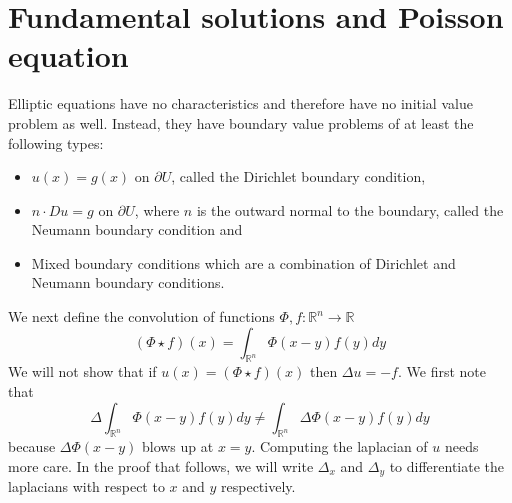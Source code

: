 \documentclass{article}
\theoremstyle{plain}
\numberwithin{thm}{section}
\theoremstyle{plain}
\numberwithin{prop}{section}
\theoremstyle{definition}
\numberwithin{defn}{section}
\theoremstyle{remark}
\numberwithin{equation}{section}
\begin{document}
\section{Fundamental solutions and Poisson equation}\label{s20}
Elliptic equations have no characteristics and therefore have no initial value problem as well. 
Instead, they have boundary value problems of at least the following types:
\begin{itemize} 
\item $u(x) = g(x)$ on $\partial U$, called the Dirichlet boundary condition,
\item $n\cdot Du = g$ on $\partial U$, where $n$ is the outward normal to the boundary, called
the Neumann boundary condition and
\item Mixed boundary conditions which are a combination of Dirichlet and Neumann boundary conditions.
\end{itemize}

\noindent We next define the convolution of functions $\Phi, f: \mathbb{R}^n \rightarrow \mathbb{R}$
\begin{equation}\label{s20e1}
(\Phi \star f)(x) = \int_{\mathbb{R}^n}\Phi(x - y)f(y)dy
\end{equation}
We will not show that if $u(x) = (\Phi \star f)(x)$ then $\Delta u = -f$. We first note that
\[
\Delta \int_{\mathbb{R}^n}\Phi(x - y)f(y)dy \ne \int_{\mathbb{R}^n}\Delta \Phi(x - y)f(y)dy
\]
because $\Delta\Phi(x - y)$ blows up at $x = y$. Computing the laplacian of $u$ needs more care. In
the proof that follows, we will write $\Delta_x$ and $\Delta_y$ to differentiate the laplacians with
respect to $x$ and $y$ respectively.
\end{document}
